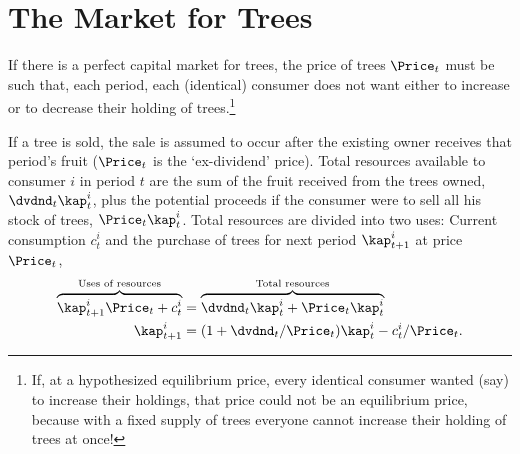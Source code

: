 \documentclass{\handout}
\begin{document}
\hypertarget{The-Market-for-Trees}{}
\section{The Market for Trees}

If there is a perfect capital market for trees, the price of trees $\Price_{t}$ must be such that, each period, each (identical) consumer does not want either to increase or to decrease their holding of trees.\footnote{If, at a hypothesized equilibrium price, every identical consumer wanted (say) to increase their holdings, that price could not be an equilibrium price, because with a fixed supply of trees everyone cannot increase their holding of trees at once!}

If a tree is sold, the sale is assumed to occur after the existing owner receives that period's fruit ($\Price_{t}$ is the `ex-dividend' price).  Total resources available to consumer $i$ in period $t$ are the sum of the fruit received from the trees owned, $\dvdnd_{t}\kap_{t}^{i}$, plus the potential proceeds if the consumer were to sell all his stock of trees, $\Price_{t}\kap_{t}^{i}$.  Total resources are divided into two uses: Current consumption $c_{t}^{i}$ and the purchase of trees for next period $\kap_{t+1}^{i}$ at price $\Price_{t}$,
\begin{equation}\begin{gathered}\begin{aligned}
\overbrace{\kap_{t+1}^{i}\Price_{t}+c_{t}^{i}}^{\text{Uses of resources}}     & =  \overbrace{\dvdnd_{t}\kap_{t}^{i}+\Price_{t}\kap_{t}^{i}}^{\text{Total resources}} 
\\      \kap_{t+1}^{i} & =  (1+\dvdnd_{t}/\Price_{t})\kap_{t}^{i}-c_{t}^{i}/\Price_{t}.
\end{aligned}\end{gathered}\end{equation}
\end{document}
